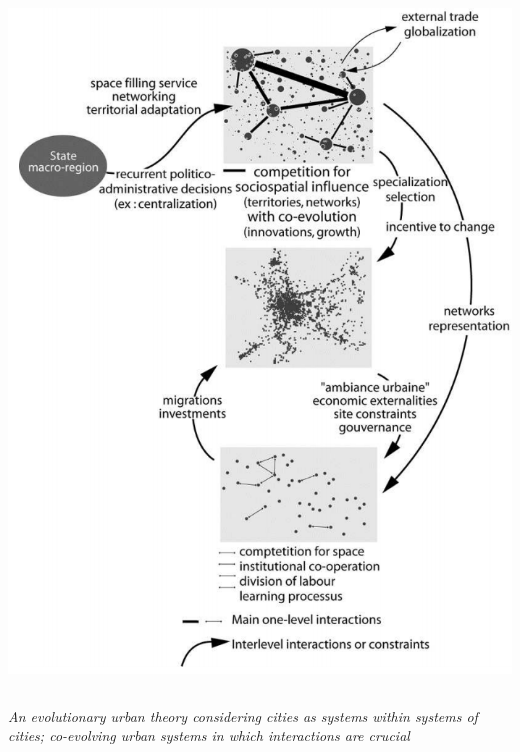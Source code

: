 {\begin{center}
\begin{columns}
\begin{column}{0.3\linewidth}
	\includegraphics[width=\linewidth]{figures/evolth_feedbacks.png}
	
	\end{column}
	\end{columns}
\end{center}

\footnotesize
\textit{An evolutionary urban theory considering cities as systems within systems of cities; co-evolving urban systems in which interactions are crucial \cite{pumain2018evolutionary} \cite{pumain1997pour} \cite{pumain2008socio}}

}


